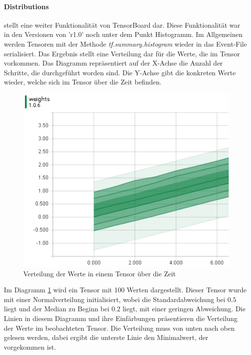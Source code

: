 \paragraph{Distributions} stellt eine weiter Funktionalität von TensorBoard dar.  %
Diese Funktionalität war in den Versionen von 'r1.0' noch unter dem Punkt Histogramm. 
Im Allgemeinen werden Tensoren mit der Methode \textit{tf.summary.histogram} wieder in das Event-File serialisiert. 
Das Ergebnis stellt eine Verteilung dar für die Werte, die im Tensor vorkommen. 
Das Diagramm repräsentiert auf der X-Achse die Anzahl der Schritte, die durchgeführt worden sind. 
Die Y-Achse gibt die konkreten Werte wieder, welche sich im Tensor über die Zeit befinden. 
\begin{figure}
	\centering
	\includegraphics[scale=0.8]{images/Distripution-small.png}
	\caption{Verteilung der Werte in einem Tensor über die Zeit}
	\label{fig:Verteilungsdiagram}
\end{figure}
Im Diagramm \ref{fig:Verteilungsdiagram} wird ein Tensor mit 100 Werten dargestellt. 
Dieser Tensor wurde mit einer Normalverteilung initialisiert, wobei die Standardabweichung bei $0.5$ liegt und der Median zu Beginn bei $0.2$ liegt, mit einer geringen Abweichung. 
Die Linien in diesem Diagramm und ihre Einfärbungen präsentieren die Verteilung der Werte im beobachteten Tensor. 
Die Verteilung muss von unten nach oben gelesen werden, dabei ergibt die unterste Linie den Minimalwert, der vorgekommen ist. 
